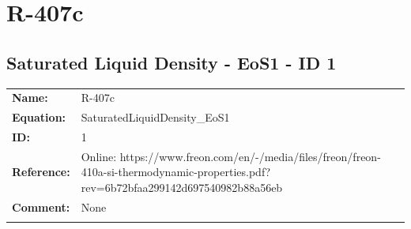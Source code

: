 \section{R-407c}
%
\subsection{Saturated Liquid Density - EoS1 - ID 1}
%
\begin{tabular}[l]{|lp{11.5cm}|}
\hline
\addlinespace

\textbf{Name:} & R-407c \\
\textbf{Equation:} & SaturatedLiquidDensity\_EoS1 \\
\textbf{ID:} & 1 \\
\textbf{Reference:} & Online: https://www.freon.com/en/-/media/files/freon/freon-410a-si-thermodynamic-properties.pdf?rev=6b72bfaa299142d697540982b88a56eb \\
\textbf{Comment:} & None \\

\addlinespace
\hline
\end{tabular}
\newline

